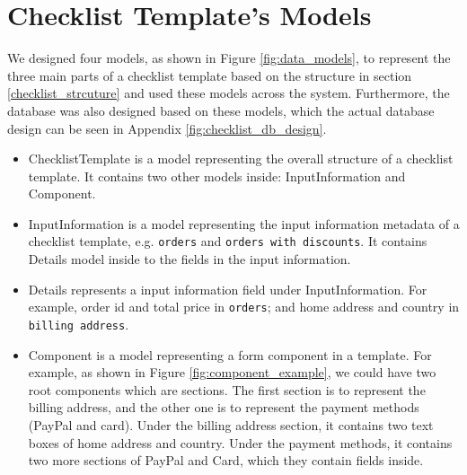 


\section{Checklist Template's Models}
\label{checklist_models}

We designed four models, as shown in Figure \ref{fig:data_models}, to represent the three main parts of a checklist template based on the structure in section \ref{checklist_strcuture} and used these models across the system. Furthermore, the database was also designed based on these models, which the actual database design can be seen in Appendix \ref{fig:checklist_db_design}.
\begin{itemize}
    \item ChecklistTemplate is a model representing the overall structure of a checklist template. It contains two other models inside: InputInformation and Component.
    \item InputInformation is a model representing the input information metadata of a checklist template, e.g. \verb!orders! and \verb!orders with discounts!. It contains Details model inside to the fields in the input information.
    \item Details represents a input information field under InputInformation. For example, order id and total price in \verb!orders!; and home address and country in \verb!billing address!.
    \item Component is a model representing a form component in a template. For example, as shown in Figure \ref{fig:component_example}, we could have two root components which are sections. The first section is to represent the billing address, and the other one is to represent the payment methods (PayPal and card). Under the billing address section, it contains two text boxes of home address and country. Under the payment methods, it contains two more sections of PayPal and Card, which they contain fields inside.
\end{itemize}


